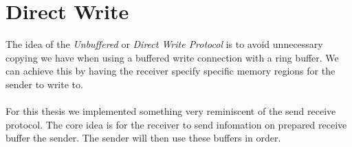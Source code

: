 \section{Direct Write}\label{sec:conn:direct_write}

The idea of the \emph{Unbuffered} or \emph{Direct Write Protocol} is to avoid unnecessary copying we have when using
a buffered write connection with a ring buffer. We can achieve this by having the receiver specify specific memory 
regions for the sender to write to. 

\paragraph{} For this thesis we implemented something very reminiscent of the send receive protocol. The core idea is for
the receiver to send infomation on prepared receive buffer the sender. The sender will then use these buffers in order. 



